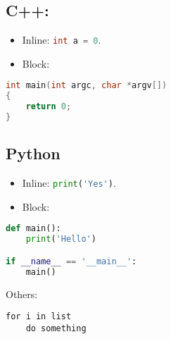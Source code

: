 \hypertarget{c}{%
\subsection{C++:}\label{c}}

\begin{itemize}
\item
  Inline: \passthrough{\lstinline[language={C++}]!int a = 0!}.
\item
  Block:
\end{itemize}

\begin{lstlisting}[language={C++}, style=cpp]
int main(int argc, char *argv[])
{
    return 0;
}
\end{lstlisting}

\hypertarget{python}{%
\subsection{Python}\label{python}}

\begin{itemize}
\item
  Inline: \passthrough{\lstinline[language=Python]!print('Yes')!}.
\item
  Block:
\end{itemize}

\begin{lstlisting}[language=Python, style=python]
def main():
    print('Hello')

if __name__ == '__main__':
    main()
\end{lstlisting}

Others:

\begin{lstlisting}
for i in list
    do something
\end{lstlisting}

